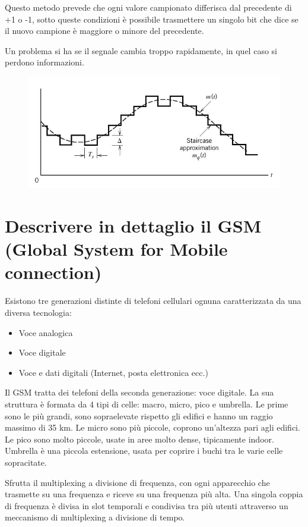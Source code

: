 Questo metodo prevede che ogni valore campionato differisca dal precedente di +1 o -1, sotto queste condizioni è possibile trasmettere un singolo bit che dice se il nuovo campione è maggiore o minore del precedente.

Un problema si ha se il segnale cambia troppo rapidamente, in quel caso si perdono informazioni.

\begin{figure}[H]
\centering
\includegraphics[scale=0.6]{res/img/6_modulazioneDelta.png}
\end{figure}
 
\section{Descrivere in dettaglio il GSM (Global System for Mobile connection)}
Esistono tre generazioni distinte di telefoni cellulari ognuna caratterizzata da una diversa tecnologia:
\begin{itemize}
\item	Voce analogica
\item	Voce digitale
\item	Voce e dati digitali (Internet, posta elettronica ecc.)
\end{itemize}
Il GSM tratta dei telefoni della seconda generazione: voce digitale.
La sua struttura è formata da 4 tipi di celle: macro, micro, pico e umbrella. 
Le prime sono le più grandi, sono sopraelevate rispetto gli edifici e hanno un raggio massimo di 35 km. Le micro sono più piccole, coprono un'altezza pari agli edifici. Le pico sono molto piccole, usate in aree molto dense, tipicamente indoor. Umbrella è una piccola estensione, usata per coprire i buchi tra le varie celle sopracitate.

Sfrutta il multiplexing a divisione di frequenza, con ogni apparecchio che trasmette su una frequenza e riceve su una frequenza più alta. Una singola coppia di frequenza è divisa in slot temporali e condivisa tra più utenti attraverso un meccanismo di multiplexing a divisione di tempo.

